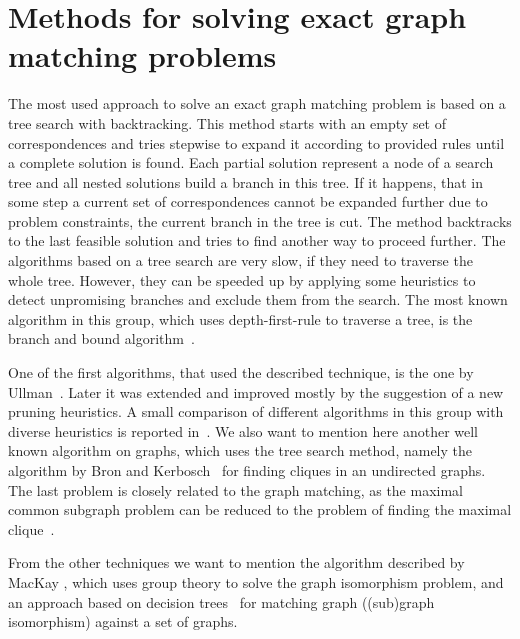 \section{Methods for solving exact graph matching problems}
The most used approach to solve an exact graph matching problem is based on a tree search with backtracking. This method starts with an empty set of correspondences and tries stepwise to expand it according to provided rules until a complete solution is found. Each partial solution represent a node of a search tree and all nested solutions build a branch in this tree. If it happens, that in some step a current set of correspondences cannot be expanded further due to problem constraints, the current branch in the tree is cut. The method backtracks to the last feasible solution and tries to find another way to proceed further. The algorithms based on a tree search are very slow, if they need to traverse the whole tree. However, they can be speeded up by applying some heuristics to detect unpromising branches and exclude them from the search. The most known algorithm in this group, which uses depth-first-rule to traverse a tree, is the branch and bound algorithm~\cite{Reingold}.

One of the first algorithms, that used the described technique, is the one by Ullman~\cite{Ullmann}. Later it was extended and improved mostly by the suggestion of a new pruning heuristics. A small comparison of different algorithms in this group with diverse heuristics is reported in~\cite{Lee2013}. We also want to mention here another well known algorithm on graphs, which uses the tree search method, namely the algorithm by Bron and Kerbosch~\cite{BronKerbosch} for finding cliques in an undirected graphs. The last problem is closely related to the graph matching, as the maximal common subgraph problem can be reduced to the problem of finding the maximal clique~\cite{Garey_NPComplet}.

From the other techniques we want to mention the algorithm described by MacKay \cite{McKay}, which uses group theory to solve the graph isomorphism problem, and an approach based on decision trees~\cite{Messmer1999,Shearer2001,Shearer1998} for matching graph ((sub)graph isomorphism) against a set of graphs.
